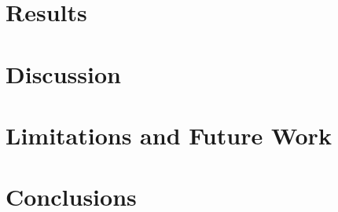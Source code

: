 \documentclass[11pt]{article}
\begin{document}
\section{Results}
\label{sec:results}

\newpage

\section{Discussion}
\label{sec:discussion}


\section{Limitations and Future Work}
\label{sec:limitations}

\newpage

\section{Conclusions}
\label{sec:conclusions}

\newpage

{}
\begingroup
\raggedright


\endgroup
\newpage


\end{document}
